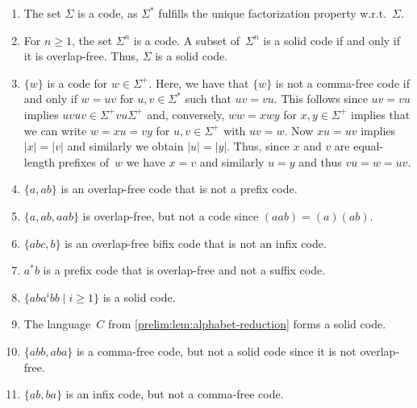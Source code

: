\begin{example} \label{constrsync:ex:binarysolidcode}
	\begin{enumerate}
		\item The set $\Sigma$ is a code, as $\Sigma^*$ fulfills the unique factorization property w.r.t.~$\Sigma$.
		
		\item For $n \ge 1$, the set $\Sigma^n$ is a code. A subset of~$\Sigma^n$
		is a solid code if and only if it is overlap-free. Thus, $\Sigma$
		is a solid code.
		
		\item \label{constrsync:ex:comma-free-single-word}  $\{ w \}$ is a code for $w \in \Sigma^+$. 
		Here, we have that 
		$\{ w \}$ is not a comma-free code if and only if $w = uv$
		for $u,v \in \Sigma^*$ such that $uv = vu$.
		This follows since $uv = vu$ implies $uvuv \in \Sigma^+ vu \Sigma^+$
		and, conversely, $ww = x w y$ for $x,y \in \Sigma^+$
		implies that we can write $w = xu = vy$ for $u,v \in \Sigma^+$
		with $uv = w$. Now $xu = uv$ implies $|x| = |v|$
		and similarly we obtain $|u| = |y|$. Thus, since $x$ and $v$
		are equal-length prefixes of~$w$ we have $x = v$
		and similarly $u = y$ and thus $vu = w = uv$.
		
		\item $\{a,ab\}$ is an overlap-free code that is not a prefix code.
		
		\item $\{a,ab,aab\}$ is overlap-free, but not a code since $(aab) = (a)(ab)$.
		
		\item $\{abc,b\}$ is an overlap-free bifix code that is not an infix code.
		
		\item $a^*b$ is a prefix code that is overlap-free and not a suffix code. 
		
		\item  \label{constrsync:ex:binarysolidcodeitem}
		$\{ aba^ibb \mid i \ge 1\}$ is a solid code. 
		
		\item The language~$C$ from \cref{prelim:lem:alphabet-reduction} forms a solid code.
		
		\item \label{constrsync:ex:comma-free-not-solid} $\{abb,aba\}$ is a comma-free code, but not a solid code since
	    it is not overlap-free.
		
		\item \label{constrsync:ex:infix-not-comma-free} $\{ab,ba\}$ is an infix code, but not a comma-free code.
		

\end{enumerate}
\end{example}
